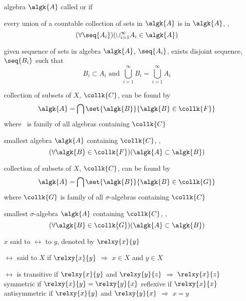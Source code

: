 \documentclass[17pt,landscape]{foils}
\newcommand\coll{\collk{C}}
\newcommand\collF{\collk{F}}
\newcommand\collG{\collk{G}}
\newcommand{\alg}{\algk{A}}
\begin{document}
{	\vitem algebra $\alg$ called  or  if%
	\bit
		\item every union of a countable collection of sets in $\alg$ is in $\alg$, \ie,
		\[
			(\forall \seq{A_i})(\cup_{i=1}^\infty A_i \in \alg)
		\]
	\eit

	\vitem given sequence of sets in algebra $\alg$, $\seq{A_i}$, exists disjoint sequence, $\seq{B_i}$ such that
		\[
			B_i \subset A_i \mbox{ and }
			\bigcup_{i=1}^\infty B_i = \bigcup_{i=1}^\infty A_i
		\]
\eit



\bit
	\item {} collection of subsets of $X$, $\coll$, can be found by%
		\[
			\alg =
			\bigcap \set{\algk{B}}{\algk{B} \in \collF}
		\]
		where \collF\ is family of all algebras containing $\coll$
	\bit
		\item smallest algebra $\alg$ containing $\coll$, \ie,%
		\[
			(\forall \algk{B} \in \collF)(\alg \subset \algk{B})
		\]
	\eit

	\vitem {} collection of subsets of $X$, $\coll$, can be found by%
		\[
			\alg=
			\bigcap \set{\algk{B}}{\algk{B} \in \collG}
		\]
		where $\collG$ is family of all $\sigma$-algebras containing $\coll$
	\bit
		\item smallest $\sigma$-algebra $\alg$ containing $\coll$, \ie,%
		\[
			(\forall \algk{B} \in \collG)(\alg \subset \algk{B})
		\]
	\eit
\eit



\bit
	\item $x$ said to  $\rel$ to $y$,
		denoted by $\relxy{x}{y}$

	\vitem $\rel$ said to  $X$ if $\relxy{x}{y}$ $\Rightarrow$ $x\in X$ and $y\in X$

	\vitem $\rel$ is
	\bit
		\vitem transitive if $\relxy{x}{y}$ and $\relxy{y}{z}$ $\Rightarrow$ $\relxy{x}{z}$
		\vitem symmetric if $\relxy{x}{y} = \relxy{y}{x}$
		\vitem reflexive if $\relxy{x}{x}$
		\vitem antisymmetric if $\relxy{x}{y}$ and $\relxy{y}{x}$ $\Rightarrow$ $x=y$
	\eit

}
\end{document}
